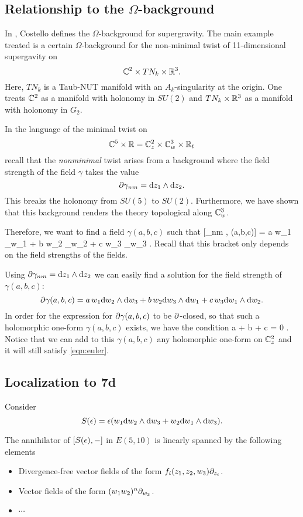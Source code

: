 \documentclass[11pt]{amsart}
\begin{document}
\subsection{Relationship to the $\Omega$-background}


In \cite{CostelloOmega}, Costello defines the $\Omega$-background for supergravity. 
The main example treated is a certain $\Omega$-background for the non-minimal twist of 11-dimensional supergavity on 
\[
\mathbb C^2 \times TN_k \times \mathbb R^3 .
\]
Here, $TN_k$ is a Taub-NUT manifold with an $A_k$-singularity at the origin. 
One treats $\mathbb C^2$ as a manifold with holonomy in $SU(2)$ and $TN_k \times \mathbb R^3$ as a manifold with holonomy in $G_2$.

In the language of the minimal twist on 
\[
\mathbb C^5 \times \mathbb R = \mathbb C^2_{z} \times \mathbb C^3_w \times \mathbb R_t 
\]
recall that the {\em nonminimal} twist arises from a background where the field strength of the field $\gamma$ takes the value 
\[
\partial \gamma_{nm} = {\rm d} z_1 \wedge {\rm d} z_2 .
\]
This breaks the holonomy from $SU(5)$ to $SU(2)$.
Furthermore, we have shown that this background renders the theory topological along $\mathbb C^3_w$. 


Therefore, we want to find a field $\gamma(a,b,c)$ such that
\beqn\label{eqn:euler}
[\gamma_{nm} , \gamma(a,b,c)] = a w_1 \del_{w_1} + b w_2 \del _{w_2} + c w_3 \del_{w_3} .
\eeqn
Recall that this bracket only depends on the field strengths of the fields. 

Using $\partial \gamma_{nm} = {\rm d} z_1 \wedge {\rm d} z_2$ we can easily find a solution for the field strength of $\gamma(a,b,c)$:
\[
\partial \gamma(a,b,c) = a \, w_1 {\rm d} w_2 \wedge {\rm d} w_3 + b \, w_2 {\rm d} w_3 \wedge {\rm d} w_1 + c \, w_3 {\rm d} w_1 \wedge {\rm d} w_2 .
\]
In order for the expression for $\partial \gamma(a,b,c)$ to be $\partial$-closed, so that such a holomorphic one-form $\gamma(a,b,c)$ exists, we have the condition
\beqn\label{eqn:abc}
a + b + c = 0 .
\eeqn
Notice that we can add to this $\gamma(a,b,c)$ any holomorphic one-form on $\mathbb C^2_z$ and it will still satisfy \eqref{eqn:euler}. 

 
\subsection{Localization to 7d}

Consider
\[
S(\epsilon) = \epsilon (w_1 {\rm d} w_2 \wedge {\rm d} w_3 + w_2 {\rm d} w_1 \wedge {\rm d} w_3) .
\]

The annihilator of $[S(\epsilon),-]$ in $E(5,10)$ is linearly spanned by the following elements
\begin{itemize}
\item Divergence-free vector fields of the form $f_i(z_1,z_2, w_3) \partial_{z_i}$. 
\item Vector fields of the form $(w_1 w_2)^n \partial_{w_3}$. 
\item $\cdots$
\end{itemize}
\end{document}
